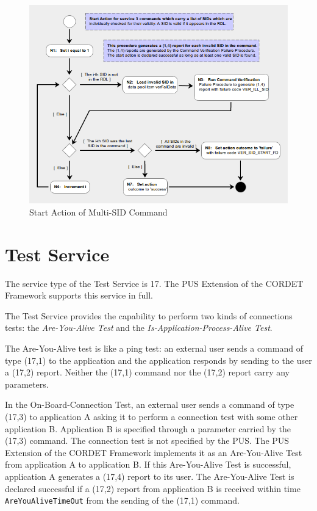 \documentclass[a4paper,10pt]{article}
\let\stdsection\section
\renewcommand\section{\newpage\stdsection}
\begin{document}
\begin{figure}[H]
 \centering
 \includegraphics[scale=0.55,keepaspectratio=true]{CrPsCmd3SidStart.png}
 \caption{Start Action of Multi-SID Command}
 \label{fig:Cmd3SidStart}
\end{figure}


\section{Test Service}\label{sec:serv17}
The service type of the Test Service is 17. The PUS Extension of the CORDET Framework supports this service in full.

The Test Service provides the capability to perform two kinds of connections tests: the \textit{Are-You-Alive Test} and the \textit{Is-Application-Process-Alive Test}.

The Are-You-Alive test is like a ping test: an external user sends a command of type (17,1) to the application and the application responds by sending to the user a (17,2) report. Neither the (17,1) command nor the (17,2) report carry any parameters. 

In the On-Board-Connection Test, an external user sends a command of type (17,3) to application A asking it to perform a connection test with some other application B. Application B is specified through a parameter carried by the (17,3) command. The connection test is not specified by the PUS. The PUS Extension of the CORDET Framework implements it as an Are-You-Alive Test from application A to application B. If this Are-You-Alive Test is successful, application A generates a (17,4) report to its user. The Are-You-Alive Test is declared successful if a (17,2) report from application B is received within time \texttt{AreYouAliveTimeOut} from the sending of the (17,1) command.
\end{document}
